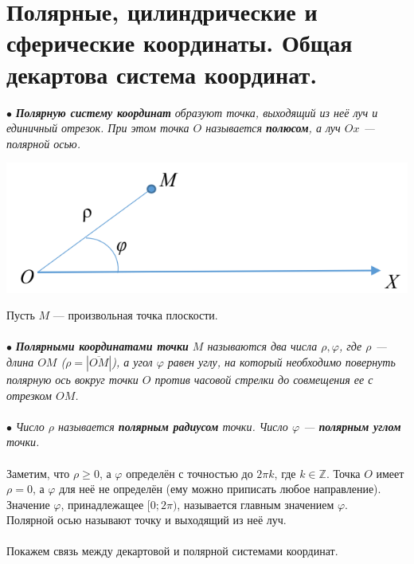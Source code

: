 \section{Полярные, цилиндрические и сферические координаты. Общая декартова система координат.}
$\bullet$ \textit{\textbf{Полярную систему координат} образуют точка, выходящий из неё луч и единичный отрезок. При этом точка $O$ называется \textbf{полюсом}, а луч $Ox$ --- полярной осью.}\begin{center}
	\includegraphics[scale=0.4]{images/polar.png}
\end{center}
Пусть $M$ --- произвольная точка плоскости.\\\\
$\bullet$ \textit{\textbf{Полярными координатами точки} $M$ называются два числа $\rho, \varphi$, где $\rho$ --- длина $OM$ ($\rho = |\overline{OM}|$), а угол $\varphi$ равен углу, на который необходимо повернуть полярную ось вокруг точки $O$ против часовой стрелки до совмещения ее с отрезком $OM$.}\\\\
$\bullet$ \textit{Число $\rho$ называется \textbf{полярным радиусом} точки. Число $\varphi$ --- \textbf{полярным углом} точки.}\\\\
Заметим, что $\rho \geqslant 0$, а $\varphi$ определён с точностью до $2\pi k$, где $k\in \mathbb{Z}$. Точка $O$ имеет $\rho = 0$, а $\varphi$ для неё не определён (ему можно приписать любое направление).\\
Значение $\varphi$, принадлежащее $[0;2\pi)$, называется главным значением $\varphi$.\\
Полярной осью называют точку и выходящий из неё луч.\\\\
Покажем связь между декартовой и полярной системами координат.\\
